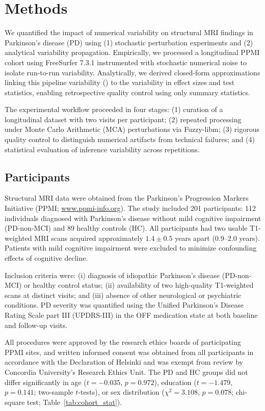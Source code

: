 \section{Methods}

We quantified the impact of numerical variability on structural MRI findings in
Parkinson's disease (PD) using (1) stochastic perturbation experiments and (2)
analytical variability propagation. Empirically, we processed a longitudinal
PPMI cohort using FreeSurfer 7.3.1 instrumented with stochastic numerical noise
to isolate run-to-run variability. Analytically, we derived closed-form
approximations linking this pipeline variability (\npvr) to the variability in
effect sizes and test statistics, enabling retrospective quality control using
only summary statistics.

The experimental workflow proceeded in four stages: (1) curation of a
longitudinal dataset with two visits per participant; (2) repeated processing
under Monte Carlo Arithmetic (MCA) perturbations via Fuzzy-libm; (3) rigorous
quality control to distinguish numerical artifacts from technical failures; and
(4) statistical evaluation of inference variability across repetitions.

\subsection{Participants\label{sec:participants}}

Structural MRI data were obtained from the Parkinson's Progression Markers
Initiative (PPMI; \url{www.ppmi-info.org}). The study included 201
participants: 112 individuals diagnosed with Parkinson's disease without mild
cognitive impairment (PD-non-MCI) and 89 healthy controls (HC). All
participants had two usable T1-weighted MRI scans acquired approximately $1.4
    \pm 0.5$ years apart ($0.9$--$2.0$ years). Patients with mild cognitive
impairment were excluded to minimize confounding effects of cognitive decline.

Inclusion criteria were: (i) diagnosis of idiopathic Parkinson's disease
(PD-non-MCI) or healthy control status; (ii) availability of two high-quality
T1-weighted scans at distinct visits; and (iii) absence of other neurological
or psychiatric conditions. PD severity was quantified using the Unified
Parkinson's Disease Rating Scale part III (UPDRS-III) in the OFF medication
state at both baseline and follow-up visits.

All procedures were approved by the research ethics boards of participating
PPMI sites, and written informed consent was obtained from all participants in
accordance with the Declaration of Helsinki and was exempt from review by
Concordia University's Research Ethics Unit. The PD and HC groups did not
differ significantly in age ($t=-0.035$, $p=0.972$), education ($t=-1.479$,
$p=0.141$; two-sample $t$-tests), or sex distribution ($\chi^2=3.108$,
$p=0.078$; chi-square test; Table~\ref{tab:cohort_stat}).

